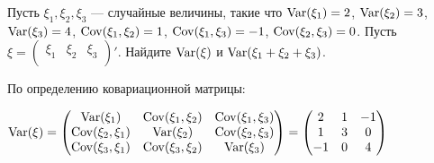 \begin{problem}
Пусть $\xi_1, \xi_2, \xi_3$ — случайные величины, такие что $\operatorname{Var} (\xi_1) = 2$, $\operatorname{Var} (\xi_2) = 3$, $\operatorname{Var} (\xi_3) = 4$, $\operatorname{Cov} (\xi_1, \xi_2) = 1$, $\operatorname{Cov} (\xi_1, \xi_3) = -1$, $\operatorname{Cov} (\xi_2, \xi_3) = 0$.
Пусть $\xi =  \begin{pmatrix}
\xi_1 & \xi_2 & \xi_3 \\
\end{pmatrix}'$. Найдите $\operatorname{Var} (\xi)$ и $\operatorname{Var} (\xi_1 + \xi_2 + \xi_3)$.


\begin{sol}
По определению ковариационной матрицы:

$\operatorname{Var} (\xi) =  \begin{pmatrix}
\operatorname{Var} (\xi_1) & \operatorname{Cov} (\xi_1, \xi_2) & \operatorname{Cov} (\xi_1, \xi_3) \\
\operatorname{Cov} (\xi_2, \xi_1) & \operatorname{Var} (\xi_2) & \operatorname{Cov} (\xi_2, \xi_3) \\
\operatorname{Cov} (\xi_3, \xi_1) & \operatorname{Cov} (\xi_3, \xi_2) & \operatorname{Var} (\xi_3) \\
\end{pmatrix}  =  \begin{pmatrix}
2 & 1 & -1 \\
1 & 3 & 0 \\
-1 & 0 & 4 \\
\end{pmatrix} $


\end{sol}
\end{problem}
